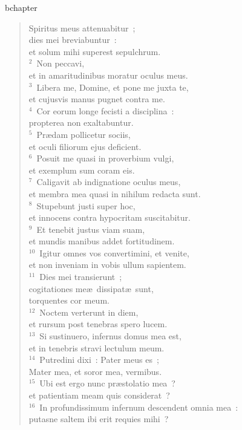 bchapter\begin{flushleft}\begin{verse}\vspace{-19pt}\hspace{6pt}Spiritus meus attenuabitur~;\\\hspace{6pt} dies mei breviabuntur~:\\ et solum mihi superest sepulchrum.\\
${}^{2}$~Non peccavi,\\ et in amaritudinibus moratur oculus meus.\\
${}^{3}$~Libera me, Domine, et pone me juxta te,\\ et cujusvis manus pugnet contra me.\\
${}^{4}$~Cor eorum longe fecisti a disciplina~:\\ propterea non exaltabuntur.\\
${}^{5}$~Pr\ae dam pollicetur sociis,\\ et oculi filiorum ejus deficient.\\
${}^{6}$~Posuit me quasi in proverbium vulgi,\\ et exemplum sum coram eis.\\
${}^{7}$~Caligavit ab indignatione oculus meus,\\ et membra mea quasi in nihilum redacta sunt.\\
${}^{8}$~Stupebunt justi super hoc,\\ et innocens contra hypocritam suscitabitur.\\
${}^{9}$~Et tenebit justus viam suam,\\ et mundis manibus addet fortitudinem.\\
${}^{10}$~Igitur omnes vos convertimini, et venite,\\ et non inveniam in vobis ullum sapientem.\\
${}^{11}$~Dies mei transierunt~;\\ cogitationes me\ae\ dissipat\ae\ sunt,\\ torquentes cor meum.\\
${}^{12}$~Noctem verterunt in diem,\\ et rursum post tenebras spero lucem.\\
${}^{13}$~Si sustinuero, infernus domus mea est,\\ et in tenebris stravi lectulum meum.\\
${}^{14}$~Putredini dixi~: Pater meus es~;\\ Mater mea, et soror mea, vermibus.\\
${}^{15}$~Ubi est ergo nunc pr\ae stolatio mea~?\\ et patientiam meam quis considerat~?\\
${}^{16}$~In profundissimum infernum descendent omnia mea~:\\ putasne saltem ibi erit requies mihi~?\end{verse}\end{flushleft}



